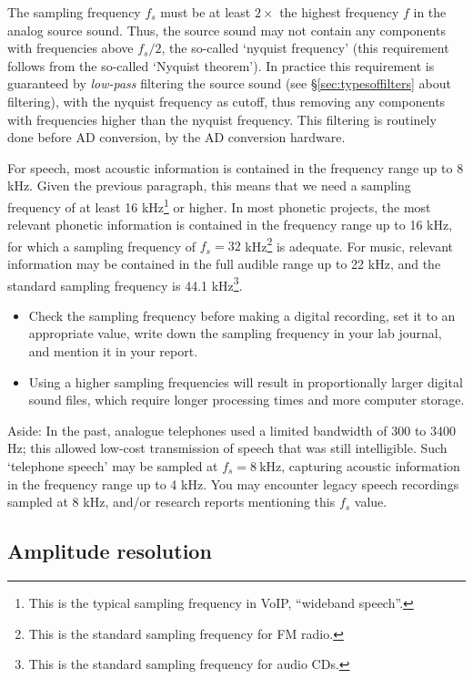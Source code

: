 \documentclass[
]{book}
\begin{document}
\label{nyquist}
The sampling frequency \(f_s\) must be at least \(2 \times\) the highest frequency \(f\) in the analog source sound. Thus, the source sound may not contain any components with frequencies above \(f_s / 2\), the so-called `nyquist frequency' (this requirement follows from the so-called `Nyquist theorem'). In practice this requirement is guaranteed by \emph{low-pass} filtering the source sound (see §\ref{sec:typesoffilters} about filtering), with the nyquist frequency as cutoff, thus removing any components with frequencies higher than the nyquist frequency. This filtering is routinely done before AD conversion, by the AD conversion hardware.

For speech, most acoustic information is contained in the frequency range up to 8 kHz. Given the previous paragraph, this means that we need a sampling frequency of at least 16 kHz\footnote{This is the typical sampling frequency in VoIP, ``wideband speech''.} or higher. In most phonetic projects, the most relevant phonetic information is contained in the frequency range up to 16 kHz, for which a sampling frequency of \(f_s = 32\) kHz\footnote{This is the standard sampling frequency for FM radio.} is adequate.
For music, relevant information may be contained in the full audible range up to 22 kHz, and the standard sampling frequency is 44.1 kHz\footnote{This is the standard sampling frequency for audio CDs.}.

\begin{itemize}
\item
  Check the sampling frequency before making a digital recording, set it to an appropriate value, write down the sampling frequency in your lab journal, and mention it in your report.
\item
  Using a higher sampling frequencies will result in proportionally larger digital sound files, which require longer processing times and more computer storage.
\end{itemize}

\label{box:telephonebandwidth}
Aside: In the past, analogue telephones used a limited bandwidth of 300 to 3400 Hz; this allowed low-cost transmission of speech that was still intelligible. Such `telephone speech' may be sampled at \(f_s = 8\ \textrm{kHz}\), capturing acoustic information in the frequency range up to 4 kHz. You may encounter legacy speech recordings sampled at 8 kHz, and/or research reports mentioning this \(f_s\) value.

\subsection{Amplitude resolution}\label{amplitude-resolution}
\end{document}
